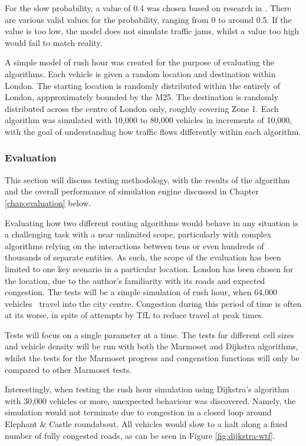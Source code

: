 \documentclass[ %
                    author={Alexander Hill},
                supervisor={Dr. Benjamin Sach},
                    degree={MEng},
                     title={MARMOSET},
                  subtitle={Multi-Agent Route Management using Online Simulation for Efficient Transportation},
                      type={research},
                      year={2016} ]{dissertation}
\begin{document}
For the slow probability, a value of 0.4 was chosen based on research in
\cite{nagel-detail}. There are various valid values for the probability, ranging
from 0 to around 0.5. If the value is too low, the model does not simulate
traffic jams, whilst a value too high would fail to match reality.

A simple model of rush hour was created for the purpose of evaluating the
algorithms. Each vehicle is given a random location and destination within
London. The starting location is randomly distributed within the entirely of
London, appproximately bounded by the M25. The destination is randomly
distributed across the centre of London only, roughly covering Zone 1. Each
algorithm was simulated with 10,000 to 80,000 vehicles in increments of 10,000,
with the goal of understanding how traffic flows differently within each
algorithm.

\subsubsection{Evaluation}

This section will discuss testing methodology, with the results of the algorithm
and the overall performance of simulation engine discussed in Chapter
\ref{chap:evaluation} below.

Evaluating how two different routing algorithms would behave in any situation is
a challenging task with a near unlimited scope, particularly with complex
algorithms relying on the interactions between tens or even hundreds of
thousands of separate entities. As such, the scope of the evaluation has been
limited to one key scenario in a particular location. London has been chosen for
the location, due to the author's familiarity with its roads and expected
congestion. The tests will be a simple simulation of rush hour, when 64,000
vehicles~\cite{tfl} travel into the city centre.  Congestion during this period
of time is often at its worse, in spite of attempts by TfL to reduce travel at
peak times.

Tests will focus on a single parameter at a time. The tests for different cell
sizes and vehicle density will be run with both the Marmoset and Dijkstra
algorithms, whilst the tests for the Marmoset progress and congenstion functions
will only be compared to other Marmoset tests.

Interestingly, when testing the rush hour simulation using Dijkstra's algorithm
with 30,000 vehicles or more, unexpected behaviour was discovered. Namely, the
simulation would not terminate due to congestion in a closed loop around
Elephant \& Castle roundabout. All vehicles would slow to a halt along a fixed
number of fully congested roads, as can be seen in Figure \ref{fig:dijkstra-wtf}.
\end{document}
